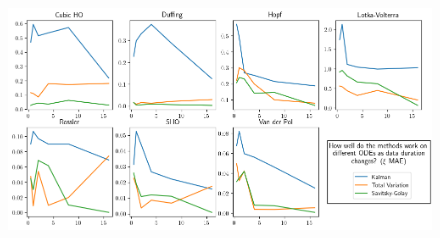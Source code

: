 \documentclass{article}
\begin{document}
\begin{figure}
    \includegraphics[width=\textwidth]{images/summary_mae}
\end{figure}
\end{document}

